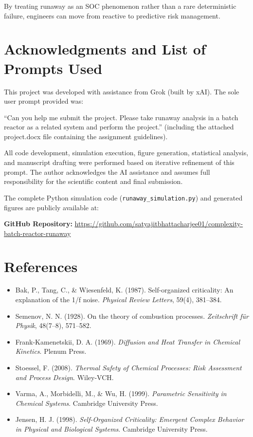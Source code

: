 \documentclass[11pt,a4paper]{article}
\begin{document}
By treating runaway as an SOC phenomenon rather than a rare deterministic failure, engineers can move from reactive to predictive risk management.

\section{Acknowledgments and List of Prompts Used}

This project was developed with assistance from Grok (built by xAI). The sole user prompt provided was:

``Can you help me submit the project. Please take runaway analysis in a batch reactor as a related system and perform the project.'' (including the attached project.docx file containing the assignment guidelines).

All code development, simulation execution, figure generation, statistical analysis, and manuscript drafting were performed based on iterative refinement of this prompt. The author acknowledges the AI assistance and assumes full responsibility for the scientific content and final submission.

The complete Python simulation code (\texttt{runaway\_simulation.py}) and generated figures are publicly available at:

\textbf{GitHub Repository:} \href{https://github.com/satyajitbhattacharjee01/complexity-batch-reactor-runaway}{https://github.com/satyajitbhattacharjee01/complexity-batch-reactor-runaway}

\section{References}

\begin{itemize}
\item Bak, P., Tang, C., \& Wiesenfeld, K. (1987). Self-organized criticality: An explanation of the 1/f noise. \textit{Physical Review Letters}, 59(4), 381--384.
\item Semenov, N. N. (1928). On the theory of combustion processes. \textit{Zeitschrift für Physik}, 48(7--8), 571--582.
\item Frank-Kamenetskii, D. A. (1969). \textit{Diffusion and Heat Transfer in Chemical Kinetics}. Plenum Press.
\item Stoessel, F. (2008). \textit{Thermal Safety of Chemical Processes: Risk Assessment and Process Design}. Wiley-VCH.
\item Varma, A., Morbidelli, M., \& Wu, H. (1999). \textit{Parametric Sensitivity in Chemical Systems}. Cambridge University Press.
\item Jensen, H. J. (1998). \textit{Self-Organized Criticality: Emergent Complex Behavior in Physical and Biological Systems}. Cambridge University Press.
\end{itemize}
\end{document}
